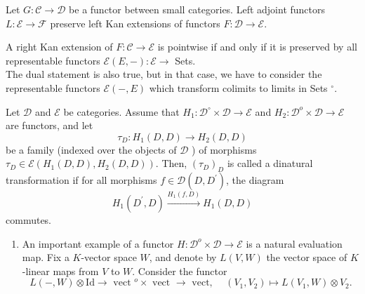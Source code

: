 \begin{example}
\begin{theo}
Let $G: \mathcal{C} \rightarrow \mathcal{D}$ be a functor between small categories. Left adjoint functors $L: \mathcal{E} \rightarrow \mathcal{F}$ preserve left Kan extensions of functors $F: \mathcal{D} \rightarrow \mathcal{E}$.
\end{theo}

A right Kan extension of $F: \mathcal{C} \rightarrow \mathcal{E}$ is pointwise if and only if it is preserved by all representable functors $\mathcal{E}(E,-): \mathcal{E} \rightarrow$ Sets.\\
The dual statement is also true, but in that case, we have to consider the representable functors $\mathcal{E}(-, E)$ which transform colimits to limits in Sets ${ }^{\circ}$.

Let $\mathcal{D}$ and $\mathcal{E}$ be categories. Assume that $H_1: \mathcal{D}^{\circ} \times \mathcal{D} \rightarrow \mathcal{E}$ and $H_2: \mathcal{D}^o \times \mathcal{D} \rightarrow \mathcal{E}$ are functors, and let
$$
\tau_D: H_1(D, D) \rightarrow H_2(D, D)
$$
be a family (indexed over the objects of $\mathcal{D}$ ) of morphisms $\tau_D \in \mathcal{E}\left(H_1(D, D), H_2(D, D)\right)$. Then, $\left(\tau_D\right)_D$ is called a dinatural transformation if for all morphisms $f \in \mathcal{D}\left(D, D^{\prime}\right)$, the diagram
$$
H_1\left(D^{\prime}, D\right) \xrightarrow{H_1(f, D)} H_1(D, D)
$$
commutes.

\begin{enumerate}
    \item An important example of a functor $H: \mathcal{D}^o \times \mathcal{D} \rightarrow \mathcal{E}$ is a natural evaluation map. Fix a $K$-vector space $W$, and denote by $L(V, W)$ the vector space of $K$-linear maps from $V$ to $W$. Consider the functor
    $$
    L(-, W) \otimes \mathrm{Id} \rightarrow \text { vect }^o \times \text { vect } \rightarrow \text { vect, } \quad\left(V_1, V_2\right) \mapsto L\left(V_1, W\right) \otimes V_2 .
    $$
    

\end{enumerate}
\end{example}
